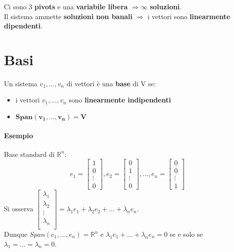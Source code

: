 \documentclass[a4paper, 12pt]{report}
\begin{document}
                Ci sono 3 \textbf{pivots} e una \textbf{variabile libera} $\Rightarrow \boldsymbol{\infty}$ \textbf{soluzioni}.\\
                Il sistema ammette \textbf{soluzioni non banali} $\Rightarrow$ i vettori sono \textbf{linearmente dipendenti}.
        \section{Basi}
            \paragraph{}Un sistema $v_1,\dots,v_n$ di vettori è una \textbf{base} di V se:
            \begin{itemize}
                \item i vettori $v_1,\dots,v_n$ sono \textbf{linearmente indipendenti}
                \item $\boldsymbol{Span(v_1,\dots,v_n) = V}$
            \end{itemize}
            \paragraph{Esempio} Base standard di $\mathbb{R}^n$:
                $$
                e_1=
                \begin{bmatrix}
                    1\\
                    0\\
                    \vdots\\
                    0
                \end{bmatrix}
                ,e_2=
                \begin{bmatrix}
                    0\\
                    1\\
                    \vdots\\
                    0
                \end{bmatrix}
                ,\dots,e_n=
                \begin{bmatrix}
                    0\\
                    0\\
                    \vdots\\
                    1
                \end{bmatrix}
                $$
                Si osserva $
                    \begin{bmatrix}
                        \lambda_1\\
                        \lambda_2\\
                        \vdots\\
                        \lambda_n\\
                    \end{bmatrix}
                = \lambda_1 e_1+\lambda_2 e_2+\dots+\lambda_n e_n.
                $\\
                Dunque $Span (e_1,\dots,e_n)=\mathbb{R}^n$ e 
                $\lambda_1 e_1+\dots+\lambda_n e_n=0$ 
                se e solo se \\$\lambda_1=\dots=\lambda_n=0$.
\end{document}

